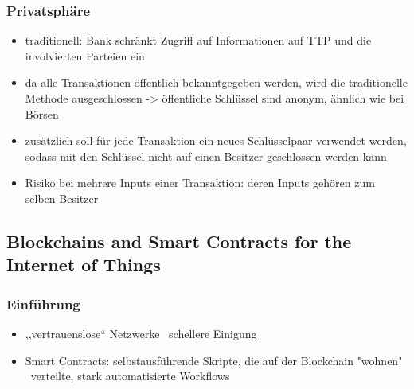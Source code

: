 \subsubsection*{Privatsphäre}
    \begin{itemize}
        \item traditionell: Bank schränkt Zugriff auf Informationen auf TTP und die involvierten Parteien ein
        \item da alle Transaktionen öffentlich bekanntgegeben werden, wird die traditionelle Methode ausgeschlossen -> öffentliche Schlüssel sind anonym, ähnlich wie bei Börsen
        \item zusätzlich soll für jede Transaktion ein neues Schlüsselpaar verwendet werden, sodass mit den Schlüssel nicht auf einen Besitzer geschlossen werden kann
        \item Risiko bei mehrere Inputs einer Transaktion: deren Inputs gehören zum selben Besitzer
    \end{itemize}


\subsection*{Blockchains and Smart Contracts for the Internet of Things}\cite{Christidis2016}
    \subsubsection*{Einführung}
        \begin{itemize}
            \item ,,vertrauenslose`` Netzwerke \textrightarrow\ schellere Einigung
            \item Smart Contracts: selbstausführende Skripte, die auf der Blockchain "wohnen" \textrightarrow\ verteilte, stark automatisierte Workflows
        \end{itemize}
        
